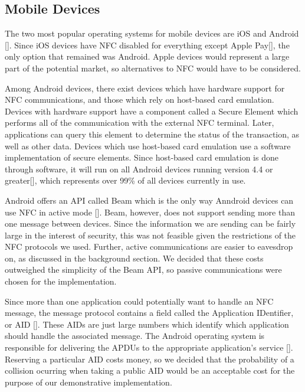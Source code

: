 \documentclass[12pt]{report}
\begin{document}
\subsection{Mobile Devices}

The two most popular operating systems for mobile devices are iOS and Android []. Since iOS devices have NFC disabled
for everything except Apple Pay[], the only option that remained was Android. Apple devices would represent a large
part of the potential market, so alternatives to NFC would have to be considered.

Among Android devices, there exist devices which have hardware support for NFC communications, and those which rely on
host-based card emulation. Devices with hardware support have a component called a Secure Element which performs all of
the communication with the external NFC terminal. Later, applications can query this element to determine the status of
the transaction, as well as other data. Devices which use host-based card emulation use a software implementation of
secure elements. Since host-based card emulation is done through software, it will run on all Android devices running
version 4.4 or greater[], which represents over 99\% of all devices currently in use.

Android offers an API called Beam which is the only way Anndroid devices can use NFC in active mode []. Beam,
however, does not support sending more than one message between devices. Since the information we are sending can be
fairly large in the interest of security, this was not feasible given the restrictions of the NFC protocols we used.
Further, active communications are easier to eavesdrop on, as discussed in the background section. We decided that these
costs outweighed the simplicity of the Beam API, so passive communications were chosen for the implementation.

Since more than one application could potentially want to handle an NFC message, the message protocol contains a field
called the Application IDentifier, or AID []. These AIDs are just large numbers which identify which application should
handle the associated message. The Android operating system is responsible for delivering the APDUs to the
appropriate application's service []. Reserving a particular AID costs money, so we decided that the probability of a
collision ocurring when taking a public AID would be an acceptable cost for the purpose of our demonstrative
implementation.
\end{document}
